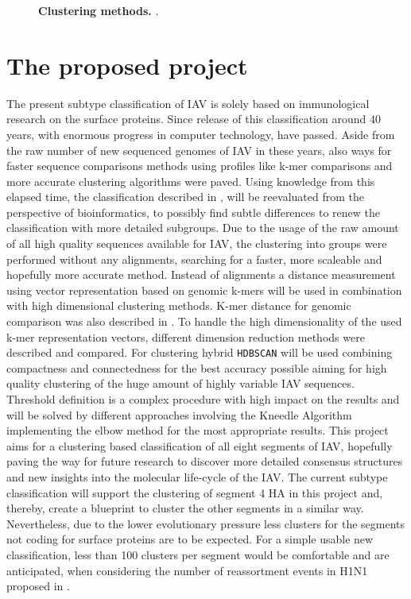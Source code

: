 \begin{figure}
\begin{subfigure}[b]{0.475\textwidth}
    \end{subfigure}
    \caption[Clustering methods]{\textbf{Clustering methods.} .}
    \label{fig:Methods}
\end{figure}

\section{The proposed project}

The present subtype classification of \gls{IAV} is solely based on immunological research on the surface proteins. Since release of this classification around 40 years, with enormous progress in computer technology, have passed. Aside from the raw number of new sequenced genomes of \gls{IAV} in these years, also ways for faster sequence comparisons methods using profiles like k-mer comparisons and more accurate clustering algorithms were paved. Using knowledge from this elapsed time, the classification described in \textcite{noauthor_revision_1980}, will be reevaluated from the perspective of bioinformatics, to possibly find subtle differences to renew the classification with more detailed subgroups. Due to the usage of the raw amount of all high quality sequences available for \gls{IAV}, the clustering into groups were performed without any alignments, searching for a faster, more scaleable and hopefully more accurate method. Instead of alignments a distance measurement using vector representation based on genomic k-mers will be used in combination with high dimensional clustering methods. K-mer distance for genomic comparison was also described in \textcite{edgar_muscle_2004}. To handle the high dimensionality of the used k-mer representation vectors, different dimension reduction methods were described and compared. For clustering hybrid \texttt{HDBSCAN} will be used combining compactness and connectedness for the best accuracy possible aiming for high quality clustering of the huge amount of highly variable \gls{IAV} sequences. Threshold definition is a complex procedure with high impact on the results and will be solved by different approaches involving the Kneedle Algorithm implementing the elbow method for the most appropriate results. This project aims for a clustering based classification of all eight segments of \gls{IAV}, hopefully paving the way for future research to discover more detailed consensus structures and new insights into the molecular life-cycle of the \gls{IAV}. The current subtype classification will support the clustering of segment 4 \gls{HA} in this project and, thereby, create a blueprint to cluster the other segments in a similar way. Nevertheless, due to the lower evolutionary pressure less clusters for the segments not coding for surface proteins are to be expected. For a simple usable new classification, less than 100 clusters per segment would be comfortable and are anticipated, when considering the number of reassortment events in H1N1 proposed in \textcite{nelson_multiple_2008}. 

